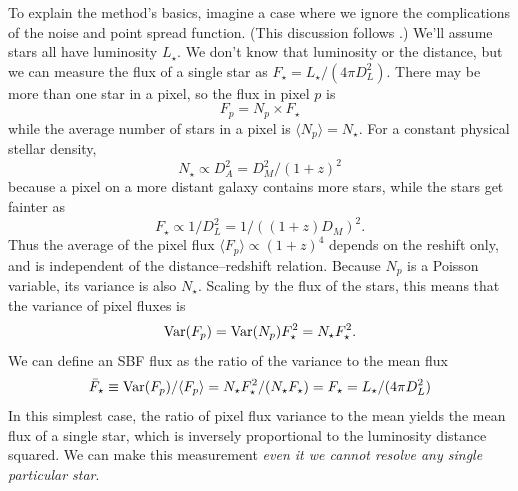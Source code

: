 To explain the method's basics, imagine a case where we ignore the complications of the noise and point spread function. (This discussion follows \citet{2023arXiv230703116C}.)  We'll assume stars all have luminosity $L_\star$.  We don't know that luminosity or the distance, but we can measure the flux of a single star as $F_\star = L_\star/(4\pi D_L^2)$.  There may be more than one star in a pixel, so the flux in pixel $p$ is
\begin{equation}
  F_p = N_p \times F_\star
\end{equation}
while the average number of stars in a pixel is $\langle N_p \rangle =  N_\star $.  For a constant physical stellar density,
\begin{equation}
  N_\star \propto D_A^2 = D_M^2 / (1+z)^2
\end{equation}
because a pixel on a more distant galaxy contains more stars, while the stars get fainter as
\begin{equation}
  F_\star \propto 1/D_L^2 = 1 / ((1+z) D_M)^2.
\end{equation}
Thus the average of the pixel flux $\langle F_p \rangle \propto (1+z)^4$ depends on the reshift only, and is independent of the distance--redshift relation.  Because $N_p$ is a Poisson variable, its variance is also $N_\star$.  Scaling by the flux of the stars, this means that the variance of pixel fluxes is
\begin{equation}
  {\rm Var}(F_p) = {\rm Var}(N_p) F_\star^2 =  N_\star F_\star^2.
\end{equation}
We can define an SBF flux as the ratio of the variance to the mean flux
\begin{equation}
  \bar F_\star \equiv  {\rm Var}(F_p)/\langle F_p \rangle = N_\star F_\star^2 / (N_\star F_\star) = F_\star = L_\star/(4\pi D_L^2)
\end{equation}
In this simplest case, the ratio of pixel flux variance to the mean yields the mean flux of a single star, which is inversely proportional to the luminosity distance squared.  We can make this measurement \textit{even it we cannot resolve any single particular star}.

